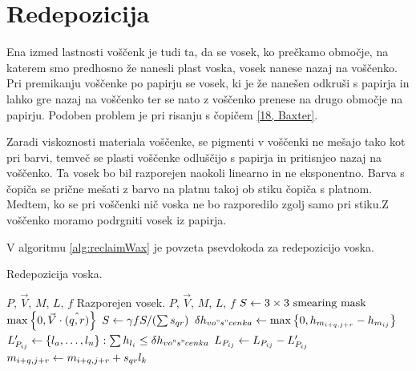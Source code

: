 \section{Redepozicija}
Ena izmed lastnosti voščenk je tudi ta, da se vosek, ko prečkamo območje, na katerem smo predhosno že nanesli plast voska, vosek nanese nazaj na voščenko. Pri premikanju voščenke po papirju se vosek, ki je že nanešen odkruši s papirja in lahko gre nazaj na voščenko ter se nato z voščenko prenese na drugo območje na papirju. Podoben problem je pri risanju s čopičem \ref{18, Baxter}. %

Zaradi viskoznosti materiala voščenke, se pigmenti v voščenki ne mešajo tako kot pri barvi, temveč se plasti voščenke odluščijo s papirja in pritisnjeo nazaj na voščenko. Ta vosek bo bil razporejen naokoli linearno in ne eksponentno. Barva s čopiča se prične mešati z barvo na platnu takoj ob stiku čopiča s platnom. Medtem, ko se pri voščenki nič voska ne bo razporedilo zgolj samo pri stiku.Z voščenko moramo podrgniti vosek iz papirja.

V algoritmu \ref{alg:reclaimWax} je povzeta psevdokoda za redepozicijo voska.

%
\begin{algorithm}[htb]
\caption{Redepozicija voska.}
\label{alg:reclaimWax}
\begin{algorithmic}[1]
\Require $P$, $\vec{V}$, $M$, $L$, $f$
\Ensure Razporejen vosek.
 {$P$, $\vec{V}$, $M$, $L$, $f$}
    \State $S \gets 3 \times 3 \text{ smearing mask}$
         {$\max\left\{0, \vec{V} \cdot \hat{(q, r)}\right\}$}
      \EndFor
      \State $S \gets \gamma f S / (\sum s_{qr})$
      \State $\delta h_{vo"s"cenka} \gets \max \left\{0, h_{m_{i+q, j+r}} - h_{m_{ij}}\right\}$
      \State $L_{P_{ij}}' \gets \left\{l_a, \ldots, l_n\right\} : \sum h_{l_i} \leq \delta h_{vo"s"cenka}$
      \State $L_{P_{ij}} \gets L_{P_{ij}} - L_{P_{ij}}'$
          \State $m_{i+q, j+r} \gets m_{i+q, j+r} + s_{qr} l_k$
        \EndFor
      \EndFor
  \EndFor
\EndFunction
\end{algorithmic}
\end{algorithm}
% 
